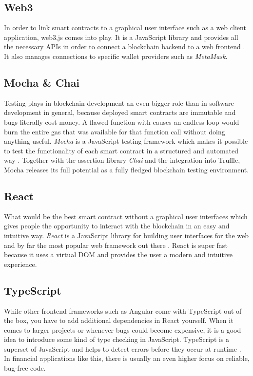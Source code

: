 \subsection{Web3}
In order to link smart contracts to a graphical user interface such as a web client application, web3.js comes into play. It is a JavaScript library and provides all the necessary APIs in order to connect a blockchain backend to a web frontend \cite{Web3}. It also manages connections to specific wallet providers such as \textit{MetaMask}.

\subsection{Mocha \& Chai}
Testing plays in blockchain development an even bigger role than in software development in general, because deployed smart contracts are immutable and bugs literally cost money. A flawed function with causes an endless loop would burn the entire gas that was available for that function call without doing anything useful. \textit{Mocha} is a JavaScript testing framework which makes it possible to test the functionality of each smart contract in a structured and automated way \cite{Mocha}. Together with the assertion library \textit{Chai} \cite{Chai} and the integration into Truffle, Mocha releases its full potential as a fully fledged blockchain testing environment.

\subsection{React}
What would be the best smart contract without a graphical user interfaces which gives people the opportunity to interact with the blockchain in an easy and intuitive way. \textit{React} is a JavaScript library for building user interfaces for the web and by far the most popular web framework out there \cite{React}. React is super fast because it uses a virtual DOM and provides the user a modern and intuitive experience.

\subsection{TypeScript}
While other frontend frameworks such as Angular come with TypeScript out of the box, you have to add additional dependencies in React yourself. When it comes to larger projects or whenever bugs could become expensive, it is a good idea to introduce some kind of type checking in JavaScript. TypeScript is a superset of JavaScript and helps to detect errors before they occur at runtime \cite{TypeScript}. In financial applications like this, there is usually an even higher focus on reliable, bug-free code.

